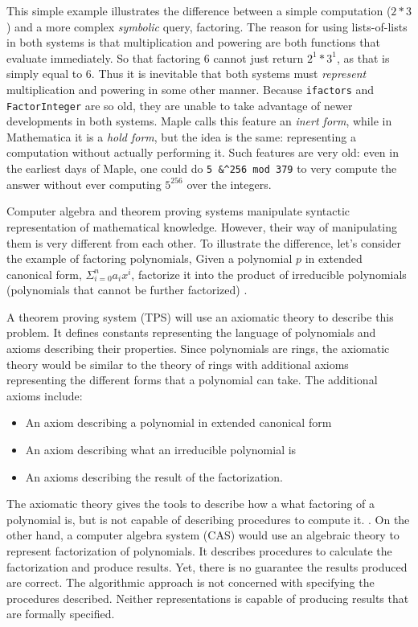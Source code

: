 \documentclass[fleqn]{llncs}
\begin{document}
This simple example illustrates the difference between a simple
computation ($2 * 3$) and a more complex \emph{symbolic} query, factoring.
The reason for using lists-of-lists in both systems is that multiplication
and powering are both functions that evaluate immediately.  So that
factoring 6 cannot just return $2^1 * 3^1$, as that is simply equal to $6$.
Thus it is inevitable that both systems must \emph{represent} multiplication
and powering in some other manner.  Because \texttt{ifactors} and
\texttt{FactorInteger} are so old, they are unable to take advantage of
newer developments in both systems.  Maple calls this feature an
\emph{inert form}, while in Mathematica it is a \emph{hold form}, but
the idea is the same: representing a computation without actually
performing it. Such features are very old: even in the earliest days
of Maple, one could do \texttt{5 \&\textasciicircum 256 mod 379} to
very compute the answer without ever computing $5^{256}$ over the 
integers.


Computer algebra and theorem proving systems manipulate syntactic
representation of mathematical knowledge. However, their way of manipulating
them is very different from each other. To illustrate the difference, let's
consider the example of factoring polynomials, Given a polynomial $p$ in
extended canonical form, $\Sigma_{i=0}^{n}a_i x^i$, factorize it into the
product of irreducible polynomials (polynomials that cannot be further
factorized) \cite{von2003modern}.
 
A theorem proving system (TPS) will use an axiomatic theory to describe this
problem. It defines constants representing the language of polynomials and
axioms describing their properties.  Since polynomials are rings, the axiomatic
theory would be similar to the theory of rings with additional axioms
representing the different forms that a polynomial can take. The additional
axioms include: 
\begin{itemize}
	\item An axiom describing a polynomial in extended canonical form 
	\item An axiom describing what an irreducible polynomial is 
	\item An axioms describing the result of the factorization. 
\end{itemize}
The axiomatic theory gives the tools to describe how a what factoring of a polynomial is, but is not capable of describing procedures to compute it. 
. 
On the other hand, a computer algebra system (CAS) would use an algebraic
theory to represent factorization of polynomials. It describes procedures to
calculate the factorization and produce results.  Yet, there is no guarantee
the results produced are correct. The algorithmic approach is not concerned
with specifying the procedures described.  Neither representations is capable
of producing results that are formally specified. 
\end{document}
